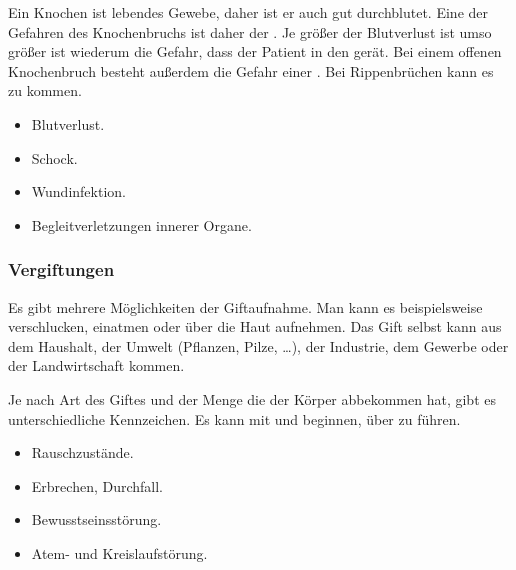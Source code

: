 {
Ein Knochen ist lebendes
Gewebe, daher ist er auch gut durchblutet. Eine der Gefahren des
Knochenbruchs ist daher der . Je größer der Blutverlust ist
umso größer ist wiederum die Gefahr, dass der Patient in den 
gerät. Bei einem offenen Knochenbruch besteht außerdem die Gefahr einer . Bei Rippenbrüchen kann
es zu  kommen. 
}{
\begin{itemize}
    \item Blutverlust.
    \item Schock.
    \item Wundinfektion.
    \item Begleitverletzungen innerer Organe.
\end{itemize}
}{}{}{}


\subsubsection{Vergiftungen}

{
Es gibt mehrere Möglichkeiten der Giftaufnahme. Man kann
es beispielsweise verschlucken, einatmen oder über die Haut aufnehmen. Das Gift
selbst kann aus dem Haushalt, der Umwelt (Pflanzen, Pilze, \ldots), der
Industrie, dem Gewerbe oder der Landwirtschaft kommen.
}{
}{}{}{}

{
Je nach Art des Giftes und der Menge die der Körper abbekommen hat, gibt es
unterschiedliche Kennzeichen. Es kann mit  und
 beginnen, über  zu
 führen.
}{
\begin{itemize}
    \item Rauschzustände.
    \item Erbrechen, Durchfall.
    \item Bewusstseinsstörung.
    \item Atem- und Kreislaufstörung.
\end{itemize}
}{}{}{}

